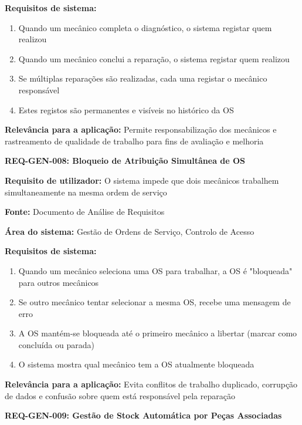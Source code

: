 \documentclass[11pt,a4paper]{article}
\newcommand{\reqheader}[1]{{\noindent\large\bfseries\color{sectionblue}#1}\par\vspace{0.3cm}}
\newcommand{\reqfield}[2]{{\noindent\textbf{#1:} #2}\par\vspace{0.2cm}}
\begin{document}
\reqfield{Requisitos de sistema}{
	\begin{enumerate}
		\item Quando um mecânico completa o diagnóstico, o sistema registar quem realizou
		\item Quando um mecânico conclui a reparação, o sistema registar quem realizou
		\item Se múltiplas reparações são realizadas, cada uma registar o mecânico responsável
		\item Estes registos são permanentes e visíveis no histórico da OS
	\end{enumerate}
}

\reqfield{Relevância para a aplicação}{Permite responsabilização dos mecânicos e rastreamento de qualidade de trabalho para fins de avaliação e melhoria}

\vspace{0.8cm}

\reqheader{REQ-GEN-008: Bloqueio de Atribuição Simultânea de OS}

\reqfield{Requisito de utilizador}{O sistema impede que dois mecânicos trabalhem simultaneamente na mesma ordem de serviço}

\reqfield{Fonte}{Documento de Análise de Requisitos}

\reqfield{Área do sistema}{Gestão de Ordens de Serviço, Controlo de Acesso}

\reqfield{Requisitos de sistema}{
	\begin{enumerate}
		\item Quando um mecânico seleciona uma OS para trabalhar, a OS é "bloqueada" para outros mecânicos
		\item Se outro mecânico tentar selecionar a mesma OS, recebe uma mensagem de erro
		\item A OS mantém-se bloqueada até o primeiro mecânico a libertar (marcar como concluída ou parada)
		\item O sistema mostra qual mecânico tem a OS atualmente bloqueada
	\end{enumerate}
}

\reqfield{Relevância para a aplicação}{Evita conflitos de trabalho duplicado, corrupção de dados e confusão sobre quem está responsável pela reparação}

\vspace{0.8cm}

\reqheader{REQ-GEN-009: Gestão de Stock Automática por Peças Associadas}
\end{document}
